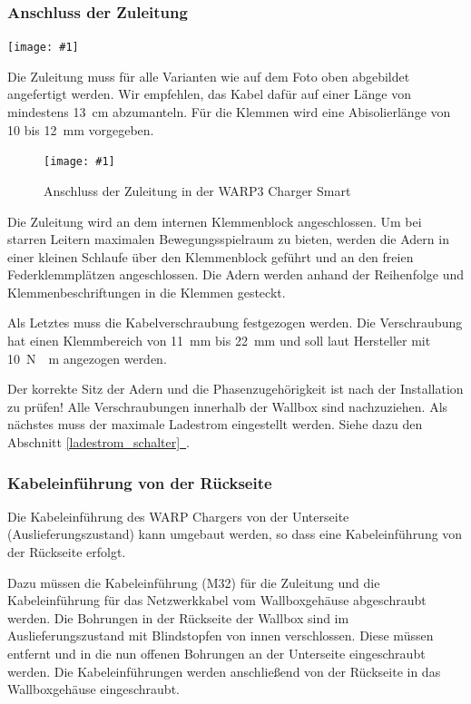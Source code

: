 \documentclass[a4paper,10pt]{article}
\newcommand{\gfx}[1]{\texttt{[image: \#1]}}
\newcommand*{\fullref}[1]{Abschnitt \hyperref[{#1}]{\ref*{#1}~\nameref*{#1}}}
\begin{document}
\begin{multicols*}{2}
    \subsubsection{Anschluss der Zuleitung}
    \gfx{./img_warp3/resized/warp_cable_cut_ready}

    Die Zuleitung muss für alle Varianten wie auf dem Foto oben abgebildet
    angefertigt werden. Wir empfehlen, das Kabel dafür auf einer Länge von
	mindestens \SI{13}{\centi\meter} abzumanteln. Für die Klemmen wird eine
    Abisolierlänge von 10 bis \SI{12}{\milli\meter} vorgegeben.


    \begin{figure}[H]
        \gfx{./img_warp3/resized/warp3_smart_open_connected}
        \caption*{Anschluss der Zuleitung in der WARP3 Charger Smart}
    \end{figure}

    Die Zuleitung wird an dem internen Klemmenblock
    angeschlossen. Um bei starren Leitern maximalen Bewegungsspielraum zu bieten,
    werden die Adern in einer kleinen Schlaufe über den Klemmenblock geführt 
	und an den freien Federklemmplätzen angeschlossen. Die Adern werden anhand der Reihenfolge und
    Klemmenbeschriftungen in die Klemmen gesteckt.

    Als Letztes muss die Kabelverschraubung festgezogen werden. Die Verschraubung
    hat einen Klemmbereich von \SI{11}{\milli\meter} bis \SI{22}{\milli\meter} und soll laut Hersteller mit
    \SI{10}{\newton{}\meter} angezogen werden.

    Der korrekte Sitz der Adern und die Phasenzugehörigkeit ist nach der
    Installation zu prüfen! Alle Verschraubungen innerhalb der Wallbox sind nachzuziehen.
    Als nächstes muss der maximale Ladestrom eingestellt werden. Siehe dazu den
	\fullref{ladestrom_schalter}.

    \subsubsection{Kabeleinführung von der Rückseite}
    Die Kabeleinführung des WARP Chargers von der Unterseite
    (Auslieferungszustand) kann umgebaut werden, so dass eine Kabeleinführung von der
    Rückseite erfolgt.

    Dazu müssen die Kabeleinführung (M32) für die Zuleitung und die
    Kabeleinführung für das Netzwerkkabel vom Wallboxgehäuse abgeschraubt
    werden. Die Bohrungen in der Rückseite der Wallbox sind im
    Auslieferungszustand mit Blindstopfen von innen verschlossen.
    Diese müssen entfernt und in die nun offenen Bohrungen an der Unterseite
    eingeschraubt werden. Die Kabeleinführungen werden anschließend von
    der Rückseite in das Wallboxgehäuse eingeschraubt.


\end{multicols*}
\end{document}
